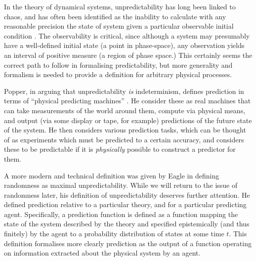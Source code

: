 \documentclass[%
 superscriptaddress,
 preprint,
 showpacs,
 showkeys,
 preprintnumbers,
  amsmath,amssymb,
  aps,
 pra,
  longbibliography,
  floatfix,
 ]{revtex4-1}
\theoremstyle{definition}
\begin{document}
In the theory of dynamical systems, unpredictability has long been linked to chaos, and has often been identified as the inability to calculate with any reasonable precision the state of system given a particular observable initial condition \cite{Werndl:2009nx}.
The observability is critical, since although a system may presumably have a well-defined initial state (a point in phase-space), any observation yields an interval of positive measure (a region of phase space.)
This certainly seems the correct path to follow in formalising predictability, but more generality and formalism is needed to provide a definition for arbitrary physical processes.

Popper, in arguing that unpredictability \emph{is} indeterminism, defines prediction in terms of ``physical predicting machines'' \cite{popper-50i}.
He consider these as real machines that can take measurements of the world around them, compute via physical means, and output (via some display or tape, for example) predictions of the future state of the system.
He then considers various prediction tasks, which can be thought of as experiments which must be predicted to a certain accuracy, and considers these to be predictable if it is \emph{physically} possible to construct a predictor for them.

A more modern and technical definition was given by Eagle \cite{Eagle:2005ys} in defining randomness as maximal unpredictability.
While we will return to the issue of randomness later, his definition of unpredictability deserves further attention.
He defined prediction relative to a particular theory, and for a particular predicting agent.
Specifically, a prediction function is defined as a function mapping the state of the system described by the theory and specified epistemically (and thus finitely) by the agent to a probability distribution of states at some time $t$.
This definition formalises more clearly prediction as the output of a function operating on information extracted about the physical system by an agent.
\end{document}
